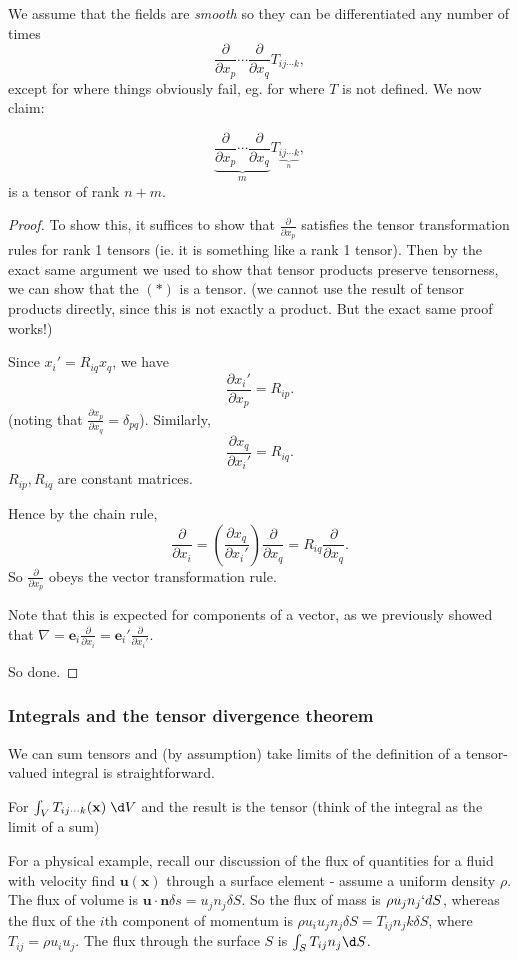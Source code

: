 \documentclass[a4paper]{article}
\begin{document}
We assume that the fields are \emph{smooth} so they can be differentiated any number of times
\[
  \frac{\partial}{\partial x_p}\cdots \frac{\partial}{\partial x_q}T_{ij\cdots k},
\]
except for where things obviously fail, eg. for where $T$ is not defined. We now claim:
\begin{prop}
  \[
    \underbrace{\frac{\partial}{\partial x_p}\cdots \frac{\partial}{\partial x_q}}_{m}T_{\underbrace{ij\cdots k}_n},\tag{$*$}
  \]
  is a tensor of rank $n + m$.
\end{prop}
\begin{proof}
  To show this, it suffices to show that $\frac{\partial}{\partial x_p}$ satisfies the tensor transformation rules for rank 1 tensors (ie. it is something like a rank 1 tensor). Then by the exact same argument we used to show that tensor products preserve tensorness, we can show that the $(*)$ is a tensor. (we cannot use the result of tensor products directly, since this is not exactly a product. But the exact same proof works!)

  Since $x_i' = R_{iq}x_q$, we have
  \[
    \frac{\partial x_i'}{\partial x_p} = R_{ip}.
  \]
  (noting that $\frac{\partial x_p}{\partial x_q} = \delta_{pq}$). Similarly,
  \[
    \frac{\partial x_q}{\partial x_i'} = R_{iq}.
  \]
  \note $R_{ip}, R_{iq}$ are constant matrices.

  Hence by the chain rule,
  \[
    \frac{\partial}{\partial x_i} = \left(\frac{\partial x_q}{\partial x_i'}\right)\frac{\partial}{\partial x_q} = R_{iq} \frac{\partial}{\partial x_q}.
  \]
  So $\frac{\partial}{\partial x_p}$ obeys the vector transformation rule.

  Note that this is expected for components of a vector, as we previously showed that $\nabla = \mathbf{e}_i \frac{\partial}{\partial x_i} = \mathbf{e}_i' \frac{\partial}{\partial x_i'}$.

  So done.
\end{proof}
\subsubsection{Integrals and the tensor divergence theorem}
We can sum tensors and (by assumption) take limits of the definition of a tensor-valued integral is straightforward.

For $\int_V T_{ij\cdots k}(\mathbf{x})\;\d V$ and the result is the tensor (think of the integral as the limit of a sum)

For a physical example, recall our discussion of the flux of quantities for a fluid with velocity find $\mathbf{u}(\mathbf{x})$ through a surface element - assume a uniform density $\rho$. The flux of volume is $\mathbf{u}\cdot \mathbf{n}\delta s = u_j n_j \delta S$. So the flux of mass is $\rho u_j n_j` dS$, whereas the flux of the $i$th component of momentum is $\rho u_i u_j n_j \delta S = T_{ij}n_jk \delta S$, where $T_{ij} = \rho u_iu_j$. The flux through the surface $S$ is $\int_S T_{ij}n_j \d S$.
\end{document}
